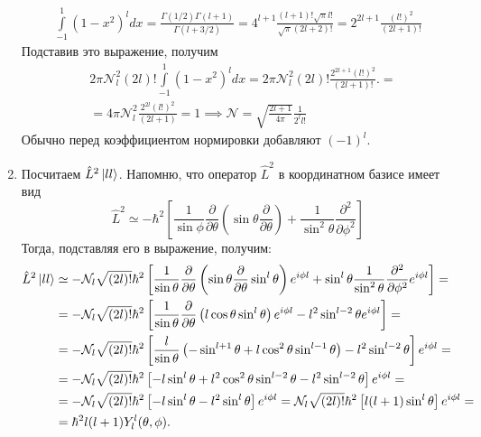 \begin{enumerate}
    \begin{align*}
        \int\limits_{-1}^1 (1-x^2)^l dx = \frac{\Gamma(1/2)\Gamma(l+1)}{\Gamma(l+3/2)} = 4^{l+1}\frac{(l+1)!\sqrt{\pi}l!}{\sqrt{\pi}(2l+2)!} = 2^{2l + 1}\frac{(l!)^2}{(2l+1)!}
    \end{align*}
    Подставив это выражение, получим
    \begin{align*}
         & 2\pi\mathcal{N}^2_l(2l)!\int\limits_{-1}^1 (1-x^2)^l dx = 2\pi\mathcal{N}^2_l(2l)!\frac{2^{2l+1}(l!)^2}{(2l+1)!}. = \\
         & = 4\pi\mathcal{N}^2_l\frac{2^{2l}(l!)^2}{(2l+1)} = 1 \implies \mathcal{N} = \sqrt{\frac{{2l+1}}{4\pi}}\frac{1}{2^ll!}
    \end{align*}
    Обычно перед коэффициентом нормировки добавляют $(-1)^{l}$.
    \item Посчитаем $\hat{L}^2\ket{ll}$. Напомню, что оператор $\hat{L}^2$ в координатном базисе имеет вид 
    \[
    \hat{L}^2 \simeq -\hbar^2\left[\frac{1}{\sin\phi}\frac{\partial}{\partial \theta}\left( \sin\theta\frac{\partial}{\partial \theta} \right) + \frac{1}{\sin^2\theta}\frac{\partial^2}{\partial\phi^2}\right]
    \]
    Тогда, подставляя его в выражение, получим:
    \begin{align*}
        \hat{L}^2\ket{ll} & \simeq  -\mathcal{N}_l\sqrt{(2l)!}\hbar^2\left[\frac{1}{\sin\theta}\frac{\partial}{\partial \theta}\left( \sin\theta\frac{\partial}{\partial \theta}\sin^l\theta \right)e^{i\phi l} + \sin^l\theta\frac{1}{\sin^2\theta}\frac{\partial^2}{\partial\phi^2} e^{i\phi l}\right] =\\
        & =  -\mathcal{N}_l\sqrt{(2l)!}\hbar^2\left[\frac{1}{\sin\theta}\frac{\partial}{\partial \theta}\left( l\cos\theta\sin^l\theta \right)e^{i\phi l} - l^2\sin^{l-2}\theta e^{i\phi l}\right] = \\
        & = -\mathcal{N}_l\sqrt{(2l)!}\hbar^2\left[\frac{l}{\sin\theta}\left(-\sin^{l+1}\theta + l\cos^2\theta\sin^{l-1}\theta\right) - l^2\sin^{l-2}\theta\right]e^{i\phi l} = \\
        & = -\mathcal{N}_l\sqrt{(2l)!}\hbar^2\left[-l\sin^{l}\theta + l^2\cos^2\theta\sin^{l-2}\theta - l^2\sin^{l-2}\theta\right]e^{i\phi l} = \\
        & = -\mathcal{N}_l\sqrt{(2l)!}\hbar^2\left[-l\sin^{l}\theta - l^2\sin^{l}\theta \right]e^{i\phi l} = \mathcal{N}_l\sqrt{(2l)!}\hbar^2\left[l(l + 1)\sin^l \theta \right]e^{i\phi l} = \\
        & = \hbar^2l(l+1)Y^l_l(\theta, \phi).
    \end{align*}

\end{enumerate}
